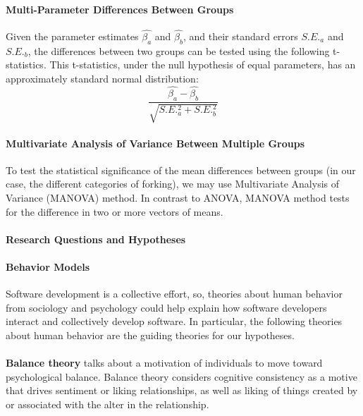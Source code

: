 \documentclass[12pt]{report}
\begin{document}
\paragraph*{Multi-Parameter Differences Between Groups}
\label{multiParameterTest}
Given the parameter estimates $\hat{\beta_a}$ and $\hat{\beta_b}$, and their standard errors $S.E._a$ and $S.E._b$, the differences between two groups can be tested using the following t-statistics. This t-statistics, under the null hypothesis of equal parameters, has an approximately standard normal distribution:
\begin{equation}
\frac{\hat{\beta_a}-\hat{\beta_b}}{\sqrt{S.E._a^2 + S.E._b^2}}
\end{equation}

\paragraph*{Multivariate Analysis of Variance Between Multiple Groups}
\label{MANOVA}
To test the statistical significance of the mean differences between groups (in our case, the different categories of forking), we may use Multivariate Analysis of Variance (MANOVA) method. In contrast to ANOVA, MANOVA method tests for the difference in two or more vectors of means. 

\paragraph*{Research Questions and Hypotheses}

\paragraph*{Behavior Models}
Software development is a collective effort, so, theories about human behavior from sociology and psychology could help explain how software developers interact and collectively develop software. In particular, the following theories about human behavior are the guiding theories for our hypotheses.  

\paragraph{} \textbf{Balance theory} \cite{Heider} talks about a motivation of individuals to move toward psychological balance. Balance theory considers cognitive consistency as a motive that drives sentiment or liking relationships, as well as liking of things created by or associated with the alter in the relationship.
\end{document}
